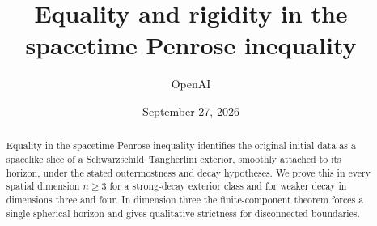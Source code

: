 \documentclass[11pt]{article}
\title{Equality and rigidity in the spacetime Penrose inequality}
\author{OpenAI}
\date{September 27, 2026}
\begin{document}
\maketitle
\begin{abstract}
Equality in the spacetime Penrose inequality identifies the original
initial data as a spacelike slice of a Schwarzschild--Tangherlini
exterior, smoothly attached to its horizon, under the stated
outermostness and decay hypotheses. We prove this in every spatial
dimension $n\ge3$ for a strong-decay exterior class and for weaker decay in
dimensions three and four. In dimension three the finite-component
theorem forces a single spherical horizon and gives qualitative
strictness for disconnected boundaries.
\end{abstract}
\tableofcontents






















\end{document}

